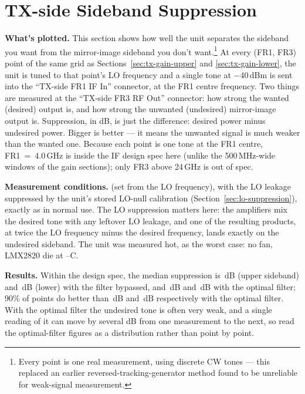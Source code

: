 \clearpage
\section{TX-side Sideband Suppression}
\label{sec:sideband-suppression}

\textbf{What's plotted.} This section shows how well the unit separates the sideband you want from the
mirror-image sideband you don't want.\footnote{Every point is one real measurement, using discrete CW tones ---
this replaced an earlier reversed-tracking-generator method found to be unreliable for weak-signal
measurement.} At every (FR1, FR3) point of the same grid as Sections~\ref{sec:tx-gain-upper} and \ref{sec:tx-gain-lower}, the unit is tuned to that point's LO frequency and a single tone at −40\,dBm is sent into the ``TX-side FR1 IF In'' connector, at the FR1 centre frequency. Two things are measured at the ``TX-side FR3 RF Out'' connector: how strong the wanted (desired) output is, and how strong the unwanted (undesired) mirror-image output is. Suppression, in dB, is just the difference: desired power minus undesired power. Bigger is better --- it means the unwanted signal is much weaker than the wanted one. Because each point is one tone at the FR1 centre, FR1~=~4.0\,GHz is inside the IF design spec here (unlike the 500\,MHz-wide windows of the gain sections); only FR3 above 24\,GHz is out of spec.

\textbf{Measurement conditions.} \lmxDriveRule{} (set from the LO frequency), with the LO leakage suppressed by the unit's stored LO-null calibration (Section~\ref{sec:lo-suppression}), exactly as in normal use. The LO suppression matters here: the amplifiers mix the desired tone with any leftover LO leakage, and one of the resulting products, at twice the LO frequency minus the desired frequency, lands exactly on the undesired sideband. The unit was measured hot, as the worst case: no fan, LMX2820 die at \condSbMinC--\condSbMaxC\textdegree C.

\textbf{Results.} Within the design spec, the median suppression is \sbUpperBypassMedian\,dB (upper sideband) and \sbLowerBypassMedian\,dB (lower) with the filter bypassed, and \sbUpperOptimalMedian\,dB and \sbLowerOptimalMedian\,dB with the optimal filter; 90\% of points do better than \sbUpperOptimalPten\,dB and \sbLowerOptimalPten\,dB respectively with the optimal filter. With the optimal filter the undesired tone is often very weak, and a single reading of it can move by several dB from one measurement to the next, so read the optimal-filter figures as a distribution rather than point by point.

